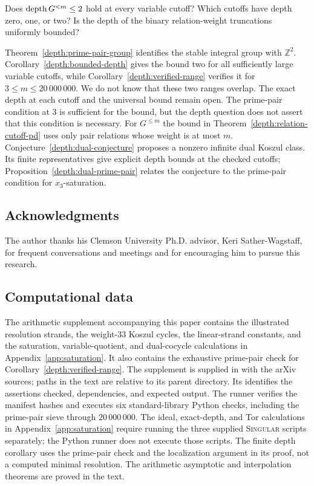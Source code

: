 \begin{question}
Does $\operatorname{depth} G^{<m}\le2$ hold at every variable cutoff? Which
cutoffs have depth zero, one, or two? Is the depth of the binary
relation-weight truncations uniformly bounded?
\end{question}
Theorem~\ref{depth:prime-pair-group} identifies the stable integral
group with $\mathbb Z^2$. Corollary~\ref{depth:bounded-depth} gives
the bound two for all sufficiently large variable cutoffs, while
Corollary~\ref{depth:verified-range} verifies it for
$3\le m\le20\,000\,000$. We do not know that these two ranges
overlap. The exact depth at each cutoff and the universal bound
remain open. The prime-pair condition at $3$ is sufficient for the
bound, but the depth question does not assert that this condition
is necessary.
For $G^{\le m}$ the bound in Theorem~\ref{depth:relation-cutoff-pd}
uses only pair relations whose weight is at most $m$.
Conjecture~\ref{depth:dual-conjecture} proposes a nonzero infinite
dual Koszul class. Its finite representatives give explicit depth
bounds at the checked cutoffs; Proposition~\ref{depth:dual-prime-pair}
relates the conjecture to the prime-pair condition for $x_3$-saturation.

\subsection*{Acknowledgments}
The author thanks his Clemson University Ph.D. advisor,
Keri Sather-Wagstaff, for frequent conversations and meetings and for
encouraging him to pursue this research.

\subsection*{Computational data}
The arithmetic supplement accompanying this paper contains the
illustrated resolution strands, the weight-$33$ Koszul cycles, the
linear-strand constants, and the saturation, variable-quotient, and
dual-cocycle calculations in Appendix~\ref{app:saturation}. It also
contains the exhaustive prime-pair check for
Corollary~\ref{depth:verified-range}. The supplement is supplied in
 with the arXiv sources; paths in the text are
relative to its parent directory.
Its  identifies the assertions checked, dependencies,
and expected output. The  runner verifies the manifest
hashes and executes six standard-library Python checks, including the
prime-pair sieve through $20\,000\,000$. The ideal, exact-depth, and
Tor calculations in Appendix~\ref{app:saturation} require running the
three supplied \textsc{Singular} scripts separately; the Python runner
does not execute those scripts. The finite depth corollary uses the
prime-pair check and the localization argument in its proof, not a
computed minimal resolution. The arithmetic asymptotic and
interpolation theorems are proved in the text.

